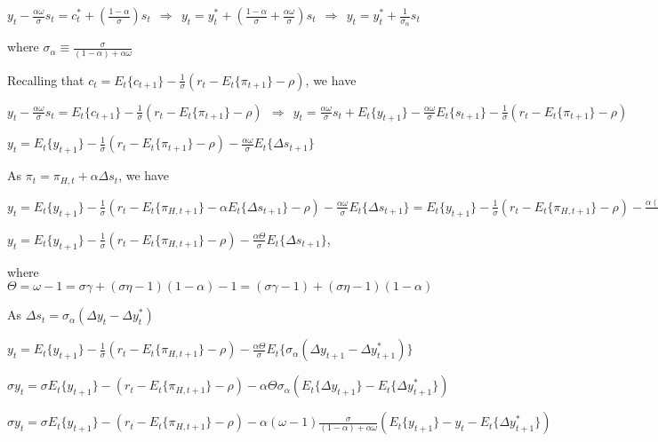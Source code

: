 \documentclass[
]{article}
\begin{document}
\(\displaystyle y_t - \frac{\alpha \omega}{\sigma}s_t = c_t^* + \left(\frac{1-\alpha}{\sigma} \right)s_t \ \ \Rightarrow \ \ y_t = y_t^* + \left(\frac{1-\alpha}{\sigma} + \frac{\alpha \omega}{\sigma} \right)s_t \ \ \Rightarrow \ \ y_t = y_t^* + \frac{1}{\sigma_\alpha}s_t\)

where
\(\displaystyle \sigma_\alpha \equiv \frac{\sigma}{(1-\alpha)+ \alpha \omega}\)

Recalling that
\(\displaystyle c_t=E_t\{c_{t+1}\}-\frac{1}{\sigma}(r_t-E_t\{\pi_{t+1}\}-\rho)\),
we have

\(\displaystyle y_t - \frac{\alpha \omega}{\sigma}s_t = E_t\{c_{t+1}\}-\frac{1}{\sigma}(r_t-E_t\{\pi_{t+1}\}-\rho) \ \ \Rightarrow \ \ y_t = \frac{\alpha \omega}{\sigma}s_t + E_t\{y_{t+1}\} - \frac{\alpha \omega}{\sigma}E_t\{s_{t+1}\} -\frac{1}{\sigma}(r_t-E_t\{\pi_{t+1}\}-\rho)\)

\(\displaystyle y_t = E_t\{y_{t+1}\} -\frac{1}{\sigma}(r_t-E_t\{\pi_{t+1}\}-\rho)- \frac{\alpha \omega}{\sigma}E_t\{\Delta s_{t+1}\}\)

As \(\pi_t = \pi_{H,t}+\alpha\Delta s_t\), we have

\(\displaystyle y_t = E_t\{y_{t+1}\} -\frac{1}{\sigma}(r_t-E_t\{\pi_{H,t+1}\}-\alpha E_t\{\Delta s_{t+1} \} -\rho)- \frac{\alpha \omega}{\sigma}E_t\{\Delta s_{t+1}\} = E_t\{y_{t+1}\} -\frac{1}{\sigma}(r_t-E_t\{\pi_{H,t+1}\} -\rho)- \frac{\alpha (\omega-1)}{\sigma}E_t\{\Delta s_{t+1}\}\)

\(\displaystyle y_t = E_t\{y_{t+1}\} -\frac{1}{\sigma}(r_t-E_t\{\pi_{H,t+1}\} -\rho)- \frac{\alpha \Theta}{\sigma}E_t\{\Delta s_{t+1}\}\),

where
\(\Theta = \omega-1 = \sigma \gamma + (\sigma \eta - 1)(1-\alpha)-1=(\sigma \gamma-1) + (\sigma \eta - 1)(1-\alpha)\)

As \(\Delta s_t= \sigma_\alpha (\Delta y_t - \Delta y_t^*)\)

\(\displaystyle y_t = E_t\{y_{t+1}\} -\frac{1}{\sigma}(r_t-E_t\{\pi_{H,t+1}\} -\rho)- \frac{\alpha \Theta}{\sigma}E_t\{\sigma_\alpha (\Delta y_{t+1} - \Delta y_{t+1}^*)\}\)

\(\displaystyle \sigma y_t = \sigma E_t\{y_{t+1}\} -(r_t-E_t\{\pi_{H,t+1}\} -\rho)- \alpha \Theta \sigma_\alpha (E_t\{ \Delta y_{t+1} \} - E_t\{\Delta y_{t+1}^*\})\)

\(\displaystyle \sigma y_t=\sigma E_t\{y_{t+1}\} -(r_t-E_t\{\pi_{H,t+1}\} -\rho)- \alpha (\omega-1) \frac{\sigma}{(1-\alpha)+\alpha \omega} (E_t\{ y_{t+1} \} -y_t - E_t\{\Delta y_{t+1}^*\})\)
\end{document}
